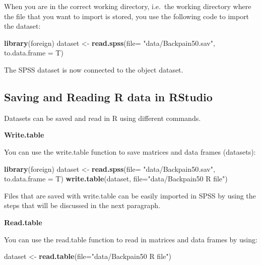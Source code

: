 \documentclass[]{book}
\newenvironment{Shaded}{\begin{snugshade}}{\end{snugshade}}
\newcommand{\KeywordTok}[1]{\textcolor[rgb]{0.13,0.29,0.53}{\textbf{#1}}}
\newcommand{\DataTypeTok}[1]{\textcolor[rgb]{0.13,0.29,0.53}{#1}}
\newcommand{\StringTok}[1]{\textcolor[rgb]{0.31,0.60,0.02}{#1}}
\newcommand{\NormalTok}[1]{#1}
\begin{document}
When you are in the correct working directory, i.e.~the working
directory where the file that you want to import is stored, you use the
following code to import the dataset:

\begin{Shaded}
\begin{Highlighting}[]
\KeywordTok{library}\NormalTok{(foreign)}
\NormalTok{dataset <-}\StringTok{ }\KeywordTok{read.spss}\NormalTok{(}\DataTypeTok{file=} \StringTok{"data/Backpain50.sav"}\NormalTok{, }\DataTypeTok{to.data.frame =}\NormalTok{ T)}
\end{Highlighting}
\end{Shaded}

The SPSS dataset is now connected to the object dataset.

\subsection{Saving and Reading R data in
RStudio}\label{saving-and-reading-r-data-in-rstudio}

Datasets can be saved and read in R using different commands.

\textbf{Write.table}

You can use the write.table function to save matrices and data frames
(datasets):

\begin{Shaded}
\begin{Highlighting}[]
\KeywordTok{library}\NormalTok{(foreign)}
\NormalTok{dataset <-}\StringTok{ }\KeywordTok{read.spss}\NormalTok{(}\DataTypeTok{file=} \StringTok{"data/Backpain50.sav"}\NormalTok{, }\DataTypeTok{to.data.frame =}\NormalTok{ T)}
\KeywordTok{write.table}\NormalTok{(dataset, }\DataTypeTok{file=}\StringTok{"data/Backpain50 R file"}\NormalTok{)}
\end{Highlighting}
\end{Shaded}

Files that are saved with write.table can be easily imported in SPSS by
using the steps that will be discussed in the next paragraph.

\textbf{Read.table}

You can use the read.table function to read in matrices and data frames
by using:

\begin{Shaded}
\begin{Highlighting}[]
\NormalTok{dataset <-}\StringTok{ }\KeywordTok{read.table}\NormalTok{(}\DataTypeTok{file=}\StringTok{"data/Backpain50 R file"}\NormalTok{)}
\end{Highlighting}
\end{Shaded}
\end{document}
